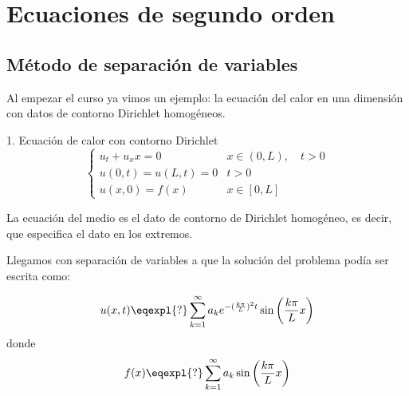 \chapter{Ecuaciones de segundo orden}
\label{chap:EcuacionesSegundoOrden}

\section{Método de separación de variables}

	Al empezar el curso ya vimos un ejemplo: la ecuación del calor en una dimensión con datos de contorno Dirichlet homogéneos.

	\begin{example}{1. Ecuación de calor con contorno Dirichlet}
		\[
		\begin{cases}
		u_t + u_xx = 0 & x \in (0,L), \quad t > 0 \\
		u(0,t) = u(L,t) = 0 & t > 0 \\
		u(x,0) = f(x) & x \in [0,L]
		\end{cases}
		\]

		La ecuación del medio es el dato de contorno de Dirichlet homogéneo, es decir, que especifica el dato en los extremos.

		Llegamos con separación de variables a que la solución del problema podía ser escrita como:

		\[ u(x,t) \eqexpl{?} \sum^{\infty}_{k=1} a_k e^{-(\frac{k\pi}{L})^2 t} \sin \left( \frac{k\pi}{L} x \right) \]
		donde
		\[ f(x) \eqexpl{?} \sum^{\infty}_{k=1} a_k \sin \left( \frac{k\pi}{L}x \right) \]
	\end{example}


